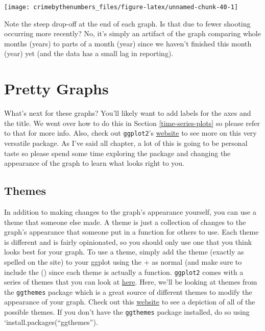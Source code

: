 \documentclass[
  12pt,
  openany]{book}
\begin{document}
\begin{center}\texttt{[image: crimebythenumbers\_files/figure-latex/unnamed-chunk-40-1]} \end{center}

Note the steep drop-off at the end of each graph. Is that due to fewer shooting occurring more recently? No, it's simply an artifact of the graph comparing whole months (years) to parts of a month (year) since we haven't finished this month (year) yet (and the data has a small lag in reporting).

\hypertarget{pretty-graphs}{%
\section{Pretty Graphs}\label{pretty-graphs}}

What's next for these graphs? You'll likely want to add labels for the axes and the title. We went over how to do this in Section \ref{time-series-plots} so please refer to that for more info. Also, check out \texttt{ggplot2}'s \href{https://ggplot2.tidyverse.org/reference/index.html\#section-scales}{website} to see more on this very versatile package. As I've said all chapter, a lot of this is going to be personal taste so please spend some time exploring the package and changing the appearance of the graph to learn what looks right to you.

\hypertarget{themes}{%
\subsection{Themes}\label{themes}}

In addition to making changes to the graph's appearance yourself, you can use a theme that someone else made. A theme is just a collection of changes to the graph's appearance that someone put in a function for others to use. Each theme is different and is fairly opinionated, so you should only use one that you think looks best for your graph. To use a theme, simply add the theme (exactly as spelled on the site) to your ggplot using the + as normal (and make sure to include the () since each theme is actually a function. \texttt{ggplot2} comes with a series of themes that you can look at \href{https://ggplot2.tidyverse.org/reference/ggtheme.html}{here}. Here, we'll be looking at themes from the \texttt{ggthemes} package which is a great source of different themes to modify the appearance of your graph. Check out this \href{https://yutannihilation.github.io/allYourFigureAreBelongToUs/ggthemes/}{website} to see a depiction of all of the possible themes. If you don't have the \texttt{ggthemes} package installed, do so using `install.packages(``ggthemes'').
\end{document}
